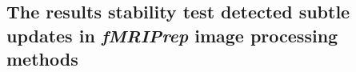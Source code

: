 \documentclass[lettersize,journal]{IEEEtran}
\newcommand{\TG}[1]{\color{orange}\textsc{TG:} #1\color{black}\xspace}
\newcommand{\fmriprep}{\emph{fMRIPrep}\xspace}
\begin{document}




\subsection{The results stability test detected subtle updates in \fmriprep image processing methods}
\end{document}
